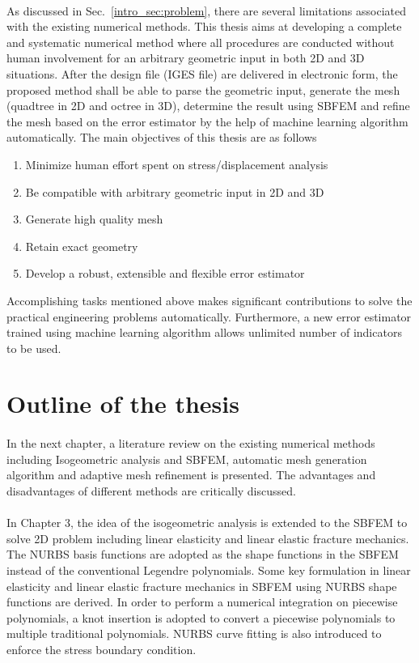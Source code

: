 \paragraph{}
As discussed in Sec.~\ref{intro_sec:problem}, there are several limitations associated with the existing numerical methods.
This thesis aims at developing a complete and systematic numerical method where all procedures are conducted without human involvement for an arbitrary geometric input in both 2D and 3D situations.
After the design file (IGES file) are delivered in electronic form, the proposed method shall be able to parse the geometric input, generate the mesh (quadtree in 2D and octree in 3D), determine the result using SBFEM and refine the mesh based on the error estimator by the help of machine learning algorithm automatically.
The main objectives of this thesis are as follows
\begin{enumerate}
    \item Minimize human effort spent on stress/displacement analysis
    \item Be compatible with arbitrary geometric input in 2D and 3D
    \item Generate high quality mesh
    \item Retain exact geometry
    \item Develop a robust, extensible and flexible error estimator
\end{enumerate}
Accomplishing tasks mentioned above makes significant contributions to solve the practical engineering problems automatically.
Furthermore, a new error estimator trained using machine learning algorithm allows unlimited number of indicators to be used.

\section{Outline of the thesis}
\paragraph{}
In the next chapter, a literature review on the existing numerical methods including Isogeometric analysis and SBFEM, automatic mesh generation algorithm and adaptive mesh refinement is presented.
The advantages and disadvantages of different methods are critically discussed.

\paragraph{}
In Chapter 3, the idea of the isogeometric analysis is extended to the SBFEM to solve 2D problem including linear elasticity and linear elastic fracture mechanics.
The NURBS basis functions are adopted as the shape functions in the SBFEM instead of the conventional Legendre polynomials.
Some key formulation in linear elasticity and linear elastic fracture mechanics in SBFEM using NURBS shape functions are derived.
In order to perform a numerical integration on piecewise polynomials, a knot insertion is adopted to convert a piecewise polynomials to multiple traditional polynomials.
NURBS curve fitting is also introduced to enforce the stress boundary condition.


